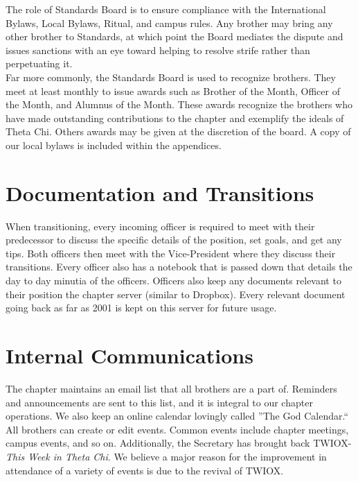       The role of Standards Board is to ensure compliance with the International Bylaws, Local Bylaws, Ritual, and campus rules. Any brother may bring any other brother to Standards, at which point the Board mediates the dispute and issues sanctions with an eye toward helping to resolve strife rather than perpetuating it. \\

      Far more commonly, the Standards Board is used to recognize brothers. They meet at least monthly to issue awards such as Brother of the Month, Officer of the Month, and Alumnus of the Month. These awards recognize the brothers who have made outstanding contributions to the chapter and exemplify the ideals of Theta Chi. Others awards may be given at the discretion of the board. A copy of our local bylaws is included within the appendices. \\
      
    \section*{Documentation and Transitions}
      When transitioning, every incoming officer is required to meet with their predecessor to discuss the specific details of the position, set goals, and get any tips. Both officers then meet with the Vice-President where they discuss their transitions. Every officer also has a notebook that is passed down that details the day to day minutia of the officers. Officers also keep any documents relevant to their position the chapter server (similar to Dropbox). Every relevant document going back as far as 2001 is kept on this server for future usage.
      
    \section*{Internal Communications}
      The chapter maintains an email list that all brothers are a part of. Reminders and announcements are sent to this list, and it is integral to our chapter operations. We also keep an online calendar lovingly called ''The God Calendar.`` All brothers can create or edit events. Common events include chapter meetings, campus events, and so on. Additionally, the Secretary has brought back TWIOX- \textit{This Week in Theta Chi}. We believe a major reason for the improvement in attendance of a variety of events is due to the revival of TWIOX.